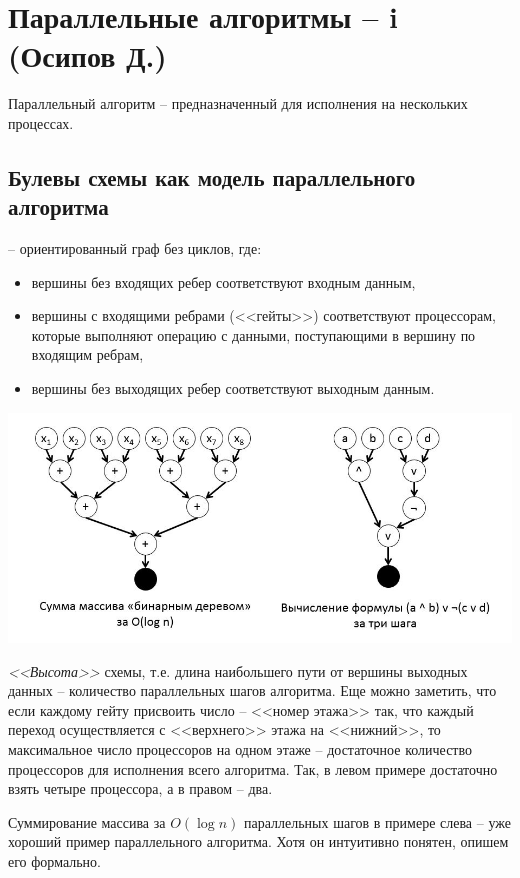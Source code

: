 \section{Параллельные алгоритмы -- i (Осипов Д.)}

Параллельный алгоритм -- предназначенный для исполнения на нескольких процессах. 
\subsection{Булевы схемы как модель параллельного алгоритма}
 -- ориентированный граф без циклов, где: 
\begin{itemize}
    \item вершины без входящих ребер соответствуют входным данным,
    \item вершины с входящими ребрами (<<гейты>>) соответствуют процессорам, которые выполняют операцию с данными, поступающими в вершину по входящим ребрам,
    \item вершины без выходящих ребер соответствуют выходным данным.
\end{itemize}
\includegraphics[scale=0.5]{figures/boolex.jpg}
 
\textit{<<Высота>>} схемы, т.е. длина наибольшего пути от вершины выходных данных -- количество параллельных шагов алгоритма. Еще можно заметить, что если каждому гейту присвоить число -- <<номер этажа>> так, что каждый переход осуществляется с <<верхнего>> этажа на <<нижний>>, то максимальное число процессоров на одном этаже -- достаточное количество процессоров для исполнения всего алгоритма. Так, в левом примере достаточно взять четыре процессора, а в правом -- два. 

Суммирование массива за $O(\log n)$ параллельных шагов в примере слева -- уже хороший пример параллельного алгоритма. Хотя он интуитивно понятен, опишем его формально. 



